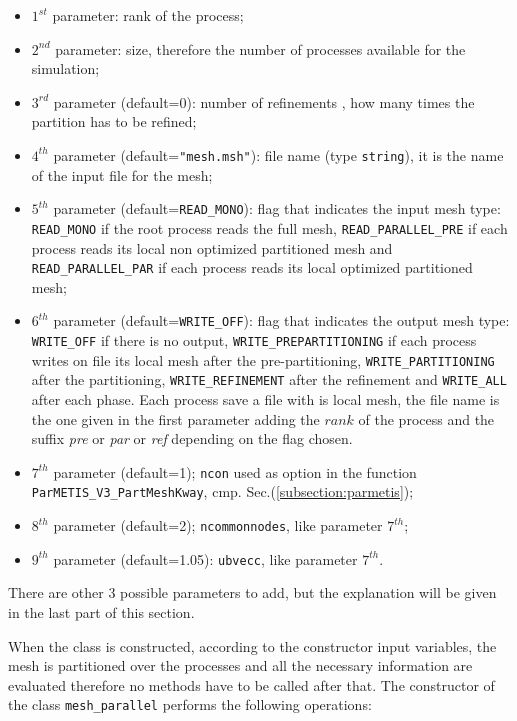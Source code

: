 \begin{itemize}
 \item $1^{st}$ parameter: rank of the process;
 \item $2^{nd}$ parameter: size, therefore the number of processes available for the simulation;
 \item $3^{rd}$ parameter (default=0): number of refinements , how many times the partition  has to be refined;
 \item $4^{th}$ parameter (default=\verb|"mesh.msh"|): file name (type \verb|string|), it is the name of the input file for the mesh;
 \item $5^{th}$ parameter (default=\verb|READ_MONO|): flag that indicates the input mesh type: \verb|READ_MONO| if the root process reads the full mesh, \verb|READ_PARALLEL_PRE| if each process reads its local non optimized partitioned mesh and \verb|READ_PARALLEL_PAR| if each process reads its local optimized partitioned mesh;
 \item $6^{th}$ parameter (default=\verb|WRITE_OFF|): flag that indicates the output mesh type: \verb|WRITE_OFF| if there is no output, \verb|WRITE_PREPARTITIONING| if each process writes on file its local mesh after the pre-partitioning, \verb|WRITE_PARTITIONING| after the partitioning, \verb|WRITE_REFINEMENT| after the refinement and \verb|WRITE_ALL| after each phase. Each process save a file with is local mesh, the file name is the one given in the first parameter adding the $rank$ of the process and the suffix \textit{pre} or \textit{par} or \textit{ref} depending on the flag chosen.
 \item $7^{th}$ parameter (default=1); \verb|ncon| used as option in the function \verb|ParMETIS_V3_PartMeshKway|, cmp. Sec.(\ref{subsection:parmetis});
 \item $8^{th}$ parameter (default=2); \verb|ncommonnodes|, like parameter $7^{th}$;
 \item $9^{th}$ parameter (default=1.05): \verb|ubvecc|, like parameter $7^{th}$.
\end{itemize}
There are other 3 possible parameters to add, but the explanation will be given in the last part of this section.
\medskip

When the class is constructed, according to the constructor input variables, the mesh is partitioned over the processes and all the necessary information are evaluated therefore no methods have to be called after that. The constructor of the class \verb|mesh_parallel| performs the following operations:


